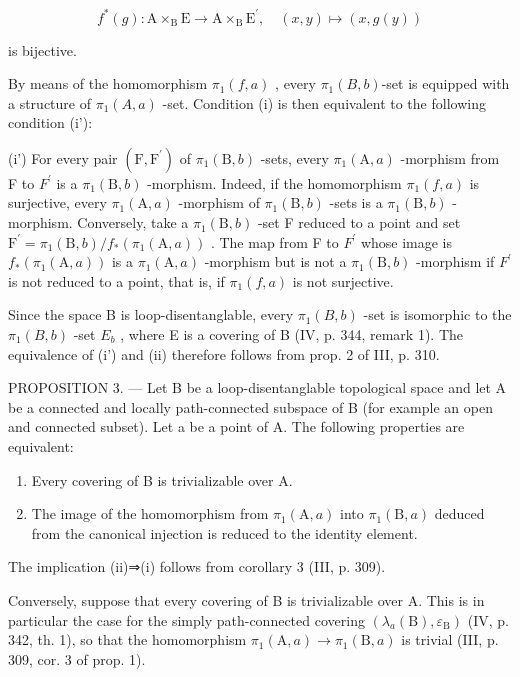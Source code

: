 \[
f ^ {*} (g) \colon \mathrm{A} \times_ {\mathrm{B}} \mathrm{E} \rightarrow \mathrm{A} \times_ {\mathrm{B}} \mathrm{E} ^ {\prime}, \quad (x, y) \mapsto (x, g (y))
\]

is bijective.

By means of the homomorphism \(\pi_1(f, a)\) , every \(\pi_1(B, b)\)-set is equipped with a structure of \(\pi_1(A, a)\) -set. Condition (i) is then equivalent to the following condition (i'):

(i') For every pair \((\mathrm{F},\mathrm{F}^{\prime})\) of \(\pi_{1}(\mathrm{B},b)\) -sets, every \(\pi_{1}(\mathrm{A},a)\) -morphism from F to \(F^{\prime}\) is a \(\pi_{1}(\mathrm{B},b)\) -morphism. Indeed, if the homomorphism \(\pi_{1}(f,a)\) is surjective, every \(\pi_{1}(\mathrm{A},a)\) -morphism of \(\pi_{1}(\mathrm{B},b)\) -sets is a \(\pi_{1}(\mathrm{B},b)\) -morphism. Conversely, take a \(\pi_{1}(\mathrm{B},b)\) -set F reduced to a point and set \(\mathrm{F}^{\prime}=\pi_{1}(\mathrm{B},b)/f_{*}(\pi_{1}(\mathrm{A},a))\) . The map from F to \(F^{\prime}\) whose image is \(f_{*}(\pi_{1}(\mathrm{A},a))\) is a \(\pi_{1}(\mathrm{A},a)\) -morphism but is not a \(\pi_{1}(\mathrm{B},b)\) -morphism if \(F^{\prime}\) is not reduced to a point, that is, if \(\pi_{1}(f,a)\) is not surjective.

Since the space B is loop-disentanglable, every \(\pi_{1}(B,b)\) -set is isomorphic to the \(\pi_{1}(B,b)\) -set \(E_{b}\) , where E is a covering of B (IV, p. 344, remark 1). The equivalence of (i') and (ii) therefore follows from prop. 2 of III, p. 310.

PROPOSITION 3. --- Let B be a loop-disentanglable topological space and let A be a connected and locally path-connected subspace of B (for example an open and connected subset). Let a be a point of A. The following properties are equivalent:

\begin{enumerate}
\def\labelenumi{(\roman{enumi})}
\item
  Every covering of B is trivializable over A.
\item
  The image of the homomorphism from \(\pi_{1}(\mathrm{A},a)\) into \(\pi_{1}(\mathrm{B},a)\) deduced from the canonical injection is reduced to the identity element.
\end{enumerate}

The implication (ii)⇒(i) follows from corollary 3 (III, p. 309).

Conversely, suppose that every covering of B is trivializable over A. This is in particular the case for the simply path-connected covering \((\lambda_{a}(\mathrm{B}),\varepsilon_{\mathrm{B}})\) (IV, p. 342, th. 1), so that the homomorphism \(\pi_{1}(\mathrm{A},a)\to\pi_{1}(\mathrm{B},a)\) is trivial (III, p. 309, cor. 3 of prop. 1).

